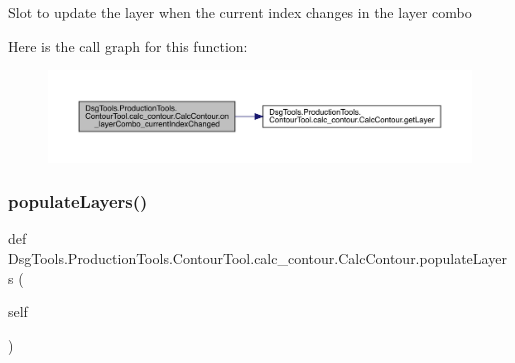 \begin{DoxyVerb}Slot to update the layer when the current index changes in the layer combo
\end{DoxyVerb}
 Here is the call graph for this function\+:
\nopagebreak
\begin{figure}[H]
\begin{center}
\leavevmode
\includegraphics[width=350pt]{class_dsg_tools_1_1_production_tools_1_1_contour_tool_1_1calc__contour_1_1_calc_contour_a1b46a4a7adf5ded9c11171b947f249ba_cgraph}
\end{center}
\end{figure}
\mbox{\label{class_dsg_tools_1_1_production_tools_1_1_contour_tool_1_1calc__contour_1_1_calc_contour_ad7e4f68d2e9a1cd8e06d46c46fa83e04}} 
\subsubsection{\texorpdfstring{populate\+Layers()}{populateLayers()}}
{\footnotesize\ttfamily def Dsg\+Tools.\+Production\+Tools.\+Contour\+Tool.\+calc\+\_\+contour.\+Calc\+Contour.\+populate\+Layers (\begin{DoxyParamCaption}\item[{}]{self }\end{DoxyParamCaption})}

